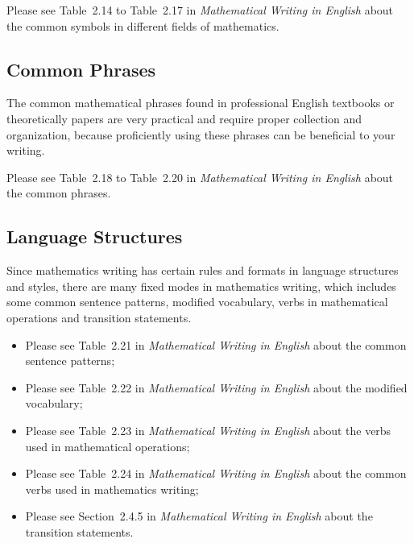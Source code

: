 Please see Table~2.14 to Table~2.17 in \emph{Mathematical Writing in English}\cite{2013数学之英文写作} about the common symbols in different fields of mathematics.


\subsection{Common Phrases}
The common mathematical phrases found in professional English textbooks or theoretically papers are very practical and require proper collection and organization, because proficiently using these phrases can be beneficial to your writing.

Please see Table~2.18 to Table~2.20 in \emph{Mathematical Writing in English}\cite{2013数学之英文写作} about the common phrases.


\subsection{Language Structures}
Since mathematics writing has certain rules and formats in language structures and styles, there are many fixed modes in mathematics writing, which includes some common sentence patterns, modified vocabulary, verbs in mathematical operations and transition statements.
\begin{itemize}[label={\dag}]
	\item Please see Table~2.21 in \emph{Mathematical Writing in English}\cite{2013数学之英文写作} about the common sentence patterns;
	\item Please see Table~2.22 in \emph{Mathematical Writing in English}\cite{2013数学之英文写作} about the modified vocabulary;
	\item Please see Table~2.23 in \emph{Mathematical Writing in English}\cite{2013数学之英文写作} about the verbs used in mathematical operations;
	\item Please see Table~2.24 in \emph{Mathematical Writing in English}\cite{2013数学之英文写作} about the common verbs used in mathematics writing;
	\item Please see Section~2.4.5 in \emph{Mathematical Writing in English}\cite{2013数学之英文写作} about the transition statements.
\end{itemize}



\nocite{2013数学之英文写作,Nicholas1998Handbook}


